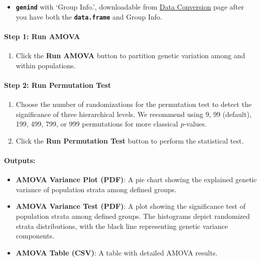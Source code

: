 \documentclass[
]{book}
\providecommand{\tightlist}{%
  \setlength{\itemsep}{0pt}\setlength{\parskip}{0pt}}
\begin{document}
\begin{itemize}
\tightlist
\item
  {\textbf{\texttt{genind}}} with `Group Info.', downloadable from \ul{Data Conversion} page after you have both the {\textbf{\texttt{data.frame}}} and Group Info.
\end{itemize}

\paragraph*{\texorpdfstring{\textbf{Step 1: Run AMOVA}}{Step 1: Run AMOVA}}\label{step-1-run-amova}

\begin{enumerate}
\def\labelenumi{\arabic{enumi}.}
\tightlist
\item
  Click the {\textbf{Run AMOVA}} button to partition genetic variation among and within populations.
\end{enumerate}

\paragraph*{\texorpdfstring{\textbf{Step 2: Run} Permutation Test}{Step 2: Run Permutation Test}}\label{step-2-run-permutation-test}

\begin{enumerate}
\def\labelenumi{\arabic{enumi}.}
\item
  Choose the number of randomizations for the permutation test to detect the significance of three hierarchical levels. We recommend using 9, 99 (default), 199, 499, 799, or 999 permutations for more classical \emph{p}-values.
\item
  Click the {\textbf{Run Permutation Test}} button to perform the statistical test.
\end{enumerate}

\paragraph*{Outputs:}\label{outputs-15}

\begin{itemize}
\item
  \textbf{AMOVA Variance Plot (PDF)}: A pie chart showing the explained genetic variance of population strata among defined groups.
\item
  \textbf{AMOVA Variance Test (PDF)}: A plot showing the significance test of population strata among defined groups. The histograms depict randomized strata distributions, with the black line representing genetic variance components.
\item
  \textbf{AMOVA Table (CSV)}: A table with detailed AMOVA results.
\end{itemize}
\end{document}
